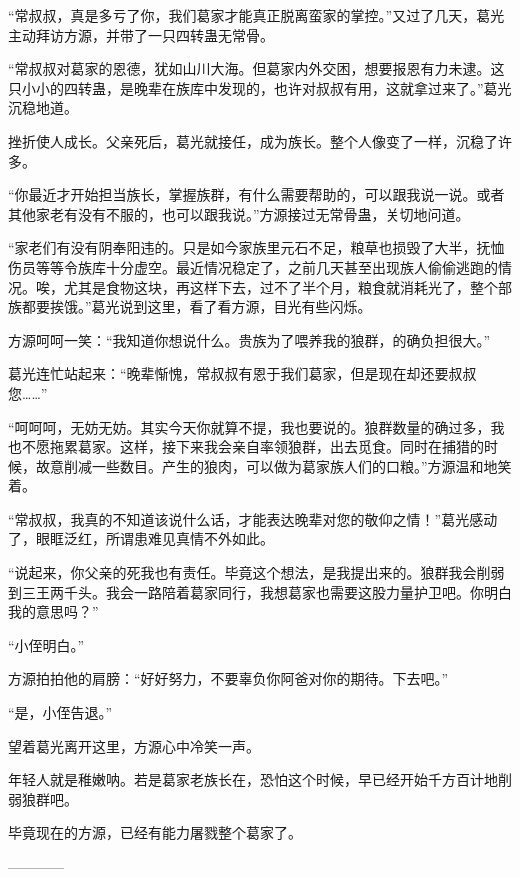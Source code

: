 \begin{this_body}
“常叔叔，真是多亏了你，我们葛家才能真正脱离蛮家的掌控。”又过了几天，葛光主动拜访方源，并带了一只四转蛊无常骨。

“常叔叔对葛家的恩德，犹如山川大海。但葛家内外交困，想要报恩有力未逮。这只小小的四转蛊，是晚辈在族库中发现的，也许对叔叔有用，这就拿过来了。”葛光沉稳地道。

挫折使人成长。父亲死后，葛光就接任，成为族长。整个人像变了一样，沉稳了许多。

“你最近才开始担当族长，掌握族群，有什么需要帮助的，可以跟我说一说。或者其他家老有没有不服的，也可以跟我说。”方源接过无常骨蛊，关切地问道。

“家老们有没有阴奉阳违的。只是如今家族里元石不足，粮草也损毁了大半，抚恤伤员等等令族库十分虚空。最近情况稳定了，之前几天甚至出现族人偷偷逃跑的情况。唉，尤其是食物这块，再这样下去，过不了半个月，粮食就消耗光了，整个部族都要挨饿。”葛光说到这里，看了看方源，目光有些闪烁。

方源呵呵一笑：“我知道你想说什么。贵族为了喂养我的狼群，的确负担很大。”

葛光连忙站起来：“晚辈惭愧，常叔叔有恩于我们葛家，但是现在却还要叔叔您……”

“呵呵呵，无妨无妨。其实今天你就算不提，我也要说的。狼群数量的确过多，我也不愿拖累葛家。这样，接下来我会亲自率领狼群，出去觅食。同时在捕猎的时候，故意削减一些数目。产生的狼肉，可以做为葛家族人们的口粮。”方源温和地笑着。

“常叔叔，我真的不知道该说什么话，才能表达晚辈对您的敬仰之情！”葛光感动了，眼眶泛红，所谓患难见真情不外如此。

“说起来，你父亲的死我也有责任。毕竟这个想法，是我提出来的。狼群我会削弱到三王两千头。我会一路陪着葛家同行，我想葛家也需要这股力量护卫吧。你明白我的意思吗？”

“小侄明白。”

方源拍拍他的肩膀：“好好努力，不要辜负你阿爸对你的期待。下去吧。”

“是，小侄告退。”

望着葛光离开这里，方源心中冷笑一声。

年轻人就是稚嫩呐。若是葛家老族长在，恐怕这个时候，早已经开始千方百计地削弱狼群吧。

毕竟现在的方源，已经有能力屠戮整个葛家了。

------------

\end{this_body}

